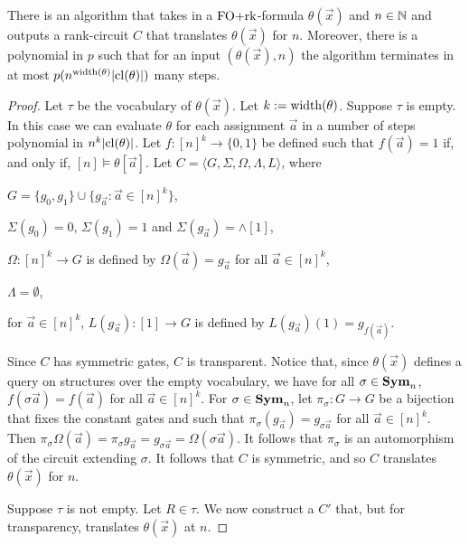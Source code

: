 \documentclass[../paper.tex]{subfiles}
\begin{document}
\begin{lem}
  There is an algorithm that takes in a $\text{\upshape FO+rk}$-formula $\theta(\vec{x})$ and $n
  \in \mathbb{N}$ and outputs a rank-circuit $C$ that translates $\theta(\vec{x})$
  for $n$. Moreover, there is a polynomial in $p$ such that for an input
  $(\theta(\vec{x}), n)$ the algorithm terminates in at most
  $p(n^{\mathrm{width}(\theta)}\vert \mathrm{cl}(\theta) \vert)$ many steps.
\end{lem}
\begin{proof}
  Let $\tau$ be the vocabulary of $\theta(\vec{x})$. Let $k := \mathrm{width}(\theta)$.
  Suppose $\tau$ is empty. In this case we can evaluate $\theta$ for each
  assignment $\vec{a}$ in a number of steps polynomial in $n^k \vert \mathrm{cl}(\theta)
  \vert$. Let $f : [n]^k \rightarrow \{0,1\}$ be defined such that $f (\vec{a})
  = 1$ if, and only if, $[n] \models \theta[\vec{a}]$. Let $C = \langle G,
  \Sigma, \Omega, \Lambda, L \rangle$, where
  \begin{itemizens}
  \item $G = \{g_0, g_1\} \cup \{g_{\vec{a}} : \vec{a} \in [n]^{k}\}$,
  \item $\Sigma (g_0) = 0$, $\Sigma (g_1) = 1$ and $\Sigma (g_{\vec{a}}) =
    \land[1]$,
  \item $\Omega : [n]^k \rightarrow G$ is defined by $\Omega(\vec{a}) =
    g_{\vec{a}}$ for all $\vec{a} \in [n]^k$,
  \item $\Lambda = \emptyset$,
  \item for $\vec{a} \in [n]^k$, $L(g_{\vec{a}}) : [1] \rightarrow G$ is defined
    by $L(g_{\vec{a}})(1) = g_{f(\vec{a})}$.
  \end{itemizens}
  
  Since $C$ has symmetric gates, $C$ is transparent. Notice that, since
  $\theta(\vec{x})$ defines a query on structures over the empty vocabulary, we
  have for all $\sigma \in \text{\textbf{Sym}}_n$, $f(\sigma \vec{a}) = f(\vec{a})$ for all
  $\vec{a} \in [n]^k$. For $\sigma \in \text{\textbf{Sym}}_n$, let $\pi_\sigma : G \rightarrow
  G$ be a bijection that fixes the constant gates and such that $\pi_{\sigma}
  (g_{\vec{a}}) = g_{\sigma \vec{a}}$ for all $\vec{a} \in [n]^k$. Then
  $\pi_\sigma \Omega (\vec{a}) = \pi_\sigma g_{\vec{a}} = g_{\sigma \vec{a}} =
  \Omega (\sigma \vec{a})$. It follows that $\pi_\sigma$ is an automorphism of
  the circuit extending $\sigma$. It follows that $C$ is symmetric, and so $C$
  translates $\theta(\vec{x})$ for $n$.

  Suppose $\tau$ is not empty. Let $R \in \tau$. We now construct a $C'$ that,
  but for transparency, translates $\theta(\vec{x})$ at $n$.


\end{proof}
\end{document}

